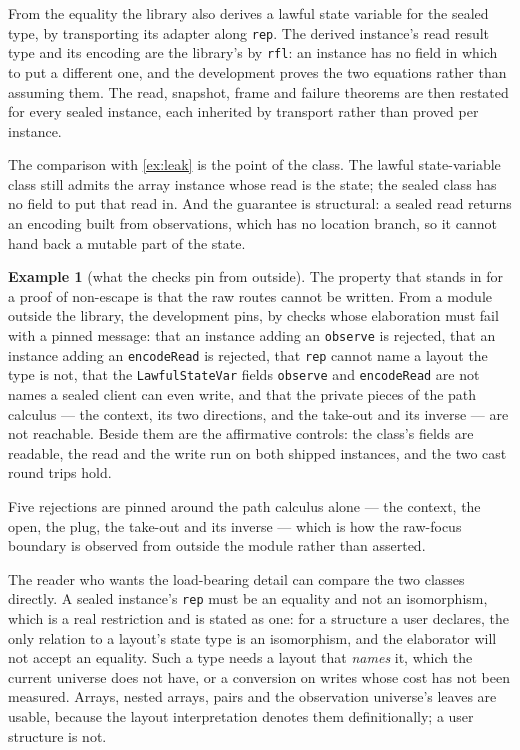 \documentclass[11pt,a4paper]{article}
\theoremstyle{definition}
\newtheorem{example}[definition]{Example}
\theoremstyle{plain}
\newcommand{\code}[1]{\texttt{#1}}
\begin{document}
From the equality the library also derives a lawful state variable for the sealed
type, by transporting its adapter along \code{rep}. The derived instance's read
result type and its encoding are the library's by \code{rfl}: an instance has no
field in which to put a different one, and the development proves the two
equations rather than assuming them. The read, snapshot, frame and
failure theorems are then restated for every sealed instance, each inherited by
transport rather than proved per instance.

The comparison with \cref{ex:leak} is the point of the class. The lawful
state-variable class still admits the array instance whose read is the state;
the sealed class has no field to put that read in. And the guarantee is
structural: a sealed read returns an encoding built from observations, which has
no location branch, so it cannot hand back a mutable part of the state.

\begin{example}[what the checks pin from outside]\label{ex:probes}
The property that stands in for a proof of non-escape is that the raw routes
cannot be written. From a module outside the library, the development pins, by
checks whose elaboration must fail with a pinned message: that an instance adding
an \code{observe} is rejected, that an instance adding an \code{encodeRead} is
rejected, that \code{rep} cannot name a layout the type is not, that the
\code{LawfulStateVar} fields \code{observe} and \code{encodeRead} are not names a
sealed client can even write, and that the private pieces of the path calculus
--- the context, its two directions, and the take-out and its inverse --- are not
reachable. Beside them are the affirmative controls: the class's fields are
readable, the read and the write run on both shipped instances, and the two
cast round trips hold.

Five rejections are pinned around the path calculus alone --- the context, the
open, the plug, the take-out and its inverse --- which is how the raw-focus
boundary is observed from outside the module rather than asserted.
\end{example}

The reader who wants the load-bearing detail can compare the two classes
directly. A sealed instance's \code{rep} must be an equality and not an
isomorphism, which is a real restriction and is stated as one: for a structure a
user declares, the only relation to a layout's state type is an isomorphism, and
the elaborator will not accept an equality. Such a type needs a layout that
\emph{names} it, which the current universe does not have, or a conversion on
writes whose cost has not been measured. Arrays, nested arrays, pairs and the
observation universe's leaves are usable, because the layout interpretation
denotes them definitionally; a user structure is not.
\end{document}
